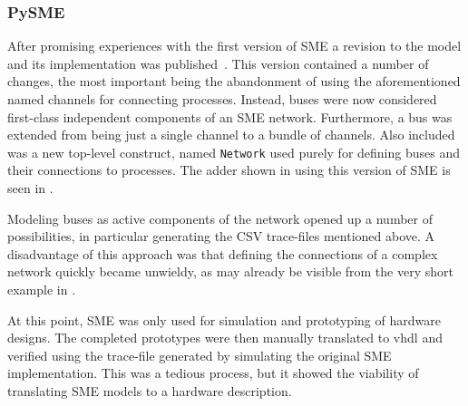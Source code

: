 \subsubsection{ PySME}
After promising experiences with the first version of SME a revision to the
model and its implementation was published~\cite{vinter2015bus}. This version
contained a number of changes, the most important being the abandonment of using
the aforementioned named channels for connecting processes. Instead, buses were
now considered first-class independent components of an SME
network. Furthermore, a bus was extended from being just a single channel to a
bundle of channels. Also included was a new top-level construct, named
\texttt{Network} used purely for defining buses and their connections to
processes. The adder shown in  using this version of SME is seen
in .

Modeling buses as active components of the network opened up a number of
possibilities, in particular generating the CSV trace-files mentioned above. A
disadvantage of this approach was that defining the connections of a complex
network quickly became unwieldy, as may already be visible from the very short
example in .

At this point, SME was only used for simulation and prototyping of hardware
designs. The completed prototypes were then manually translated to \gls{vhdl}
and verified using the trace-file generated by simulating the original SME
implementation. This was a tedious process, but it showed the viability of
translating SME models to a hardware description.



